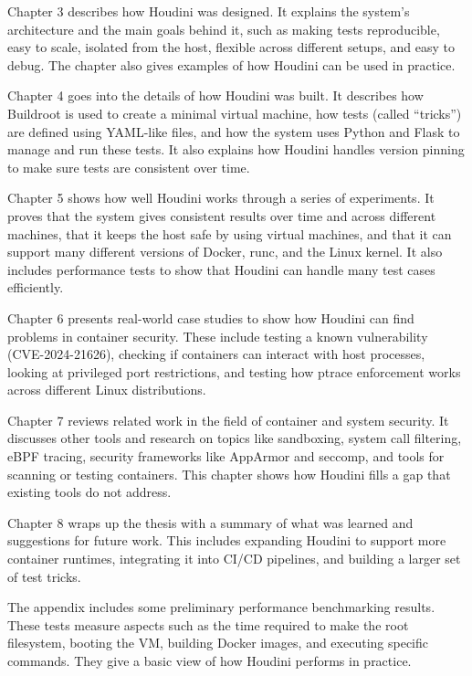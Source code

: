 \documentclass[12pt]{report}
\begin{document}
\begin{doublespace}
Chapter 3 describes how Houdini was designed. It explains the system’s architecture and the main goals behind it, such as making tests reproducible, easy to scale, isolated from the host, flexible across different setups, and easy to debug. The chapter also gives examples of how Houdini can be used in practice.

Chapter 4 goes into the details of how Houdini was built. It describes how Buildroot is used to create a minimal virtual machine, how tests (called “tricks”) are defined using YAML-like files, and how the system uses Python and Flask to manage and run these tests. It also explains how Houdini handles version pinning to make sure tests are consistent over time.

Chapter 5 shows how well Houdini works through a series of experiments. It proves that the system gives consistent results over time and across different machines, that it keeps the host safe by using virtual machines, and that it can support many different versions of Docker, runc, and the Linux kernel. It also includes performance tests to show that Houdini can handle many test cases efficiently.

Chapter 6 presents real-world case studies to show how Houdini can find problems in container security. These include testing a known vulnerability (CVE-2024-21626), checking if containers can interact with host processes, looking at privileged port restrictions, and testing how ptrace enforcement works across different Linux distributions.

Chapter 7 reviews related work in the field of container and system security. It discusses other tools and research on topics like sandboxing, system call filtering, eBPF tracing, security frameworks like AppArmor and seccomp, and tools for scanning or testing containers. This chapter shows how Houdini fills a gap that existing tools do not address.

Chapter 8 wraps up the thesis with a summary of what was learned and suggestions for future work. This includes expanding Houdini to support more container runtimes, integrating it into CI/CD pipelines, and building a larger set of test tricks.

The appendix includes some preliminary performance benchmarking results. These tests measure aspects such as the time required to make the root filesystem, booting the VM, building Docker images, and executing specific commands. They give a basic view of how Houdini performs in practice.



\end{doublespace} \fontsize{12pt}{14pt} \selectfont
\end{document}
